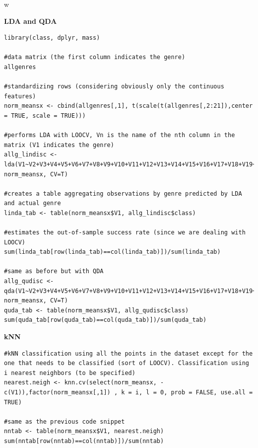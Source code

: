 w\documentclass[11pt, oneside]{article}
\begin{document}
\noindent\textbf{LDA and QDA}
\begin{lstlisting}
library(class, dplyr, mass)

#data matrix (the first column indicates the genre)
allgenres

#standardizing rows (considering obviously only the continuous features)
norm_meansx <- cbind(allgenres[,1], t(scale(t(allgenres[,2:21]),center = TRUE, scale = TRUE)))

#performs LDA with LOOCV, Vn is the name of the nth column in the matrix (V1 indicates the genre)
allg_lindisc <- lda(V1~V2+V3+V4+V5+V6+V7+V8+V9+V10+V11+V12+V13+V14+V15+V16+V17+V18+V19+V20, norm_meansx, CV=T)

#creates a table aggregating observations by genre predicted by LDA and actual genre
linda_tab <- table(norm_meansx$V1, allg_lindisc$class)

#estimates the out-of-sample success rate (since we are dealing with LOOCV)
sum(linda_tab[row(linda_tab)==col(linda_tab)])/sum(linda_tab)

#same as before but with QDA
allg_qudisc <- qda(V1~V2+V3+V4+V5+V6+V7+V8+V9+V10+V11+V12+V13+V14+V15+V16+V17+V18+V19+V20, norm_meansx, CV=T)
quda_tab <- table(norm_meansx$V1, allg_qudisc$class)
sum(quda_tab[row(quda_tab)==col(quda_tab)])/sum(quda_tab)
\end{lstlisting}

\vspace{1cm}

\noindent\textbf{kNN}
\begin{lstlisting}
#kNN classification using all the points in the dataset except for the one that needs to be classified (sort of LOOCV). Classification using i nearest neighbors (to be specified)
nearest.neigh <- knn.cv(select(norm_meansx, -c(V1)),factor(norm_meansx[,1]) , k = i, l = 0, prob = FALSE, use.all = TRUE)

#same as the previous code snippet
nntab <- table(norm_meansx$V1, nearest.neigh)
sum(nntab[row(nntab)==col(nntab)])/sum(nntab)
\end{lstlisting}
\nocite{*}
\newpage


\end{document}
